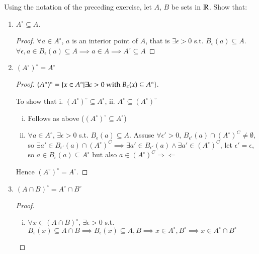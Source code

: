 
 Using the notation of the preceding exercise, let $A$, $B$ be sets in $\mathbb{R}$. Show that:

\begin{enumerate}
  \item $A^\circ \subseteq A$.

  \begin{proof}
    $\forall a\in A^\circ$, $a$ is an interior point of $A$, that is $\exists \epsilon > 0$ s.t. $B_\epsilon (a) \subseteq A$. $\forall \epsilon, a\in B_\epsilon (a)\subseteq A\implies a\in A\implies A^\circ \subseteq A$
  \end{proof}

  \item $(A^\circ)^\circ=A^\circ$

  \begin{proof}
    $(A^\circ)^\circ = \left\{ x\in A^\circ | \exists\epsilon > 0\text{ with }B_\epsilon (x) \subseteq A^\circ \right\}$.

    To show that i. $(A^\circ)^\circ\subseteq A^\circ$, ii. $A^\circ\subseteq (A^\circ)^\circ$

    \begin{enumerate}[i.]
      \item Follows as above ($(A^\circ)^\circ\subseteq A^\circ$)

      \item $\forall a\in A^\circ$, $\exists \epsilon > 0$ s.t. $B_\epsilon (a)\subseteq A$. Assuse $\forall \epsilon' > 0$, $B_{\epsilon'}(a)\cap (A^\circ)^C \neq \emptyset$, so $\exists a' \in B_{\epsilon'}(a)\cap (A^\circ)^C\implies \exists a' \in B_{\epsilon'}(a) \land \exists a' \in (A^\circ)^C$, let $\epsilon' = \epsilon$, so $a\in B_{\epsilon}(a)\subseteq A^\circ$ but also $a\in (A^\circ)^C \Rightarrow\!\Leftarrow$
    \end{enumerate}
    Hence $(A^\circ)^\circ=A^\circ$.
  \end{proof}

  \item $(A \cap B)^\circ = A^\circ \cap B^\circ$

  \begin{proof}
    \begin{enumerate}[i.]
      \item $\forall x \in (A \cap B)^\circ$, $\exists\epsilon > 0$ s.t. $B_\epsilon (x)\subseteq A\cap B\implies B_\epsilon (x)\subseteq A, B\implies x\in A^\circ, B^\circ\implies x\in A^\circ \cap B^\circ$


\end{enumerate}
\end{proof}
\end{enumerate}

